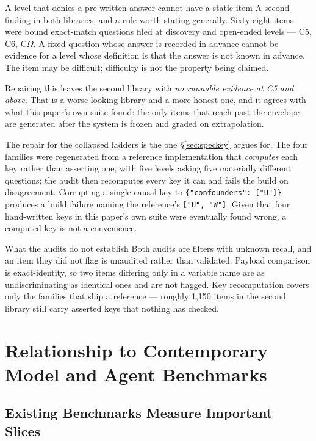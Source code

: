 \documentclass[11pt]{article}
\theoremstyle{definition}
\newcommand{\Om}{\ensuremath{\Omega}}
\begin{document}
\begin{claimbox}{A level that denies a pre-written answer cannot have a static item}
A second finding in both libraries, and a rule worth stating generally. Sixty-eight items were bound exact-match questions filed at discovery and open-ended levels --- C5, C6, C\Om{}. A fixed question whose answer is recorded in advance cannot be evidence for a level whose definition is that the answer is not known in advance. The item may be difficult; difficulty is not the property being claimed.

Repairing this leaves the second library with \emph{no runnable evidence at C5 and above}. That is a worse-looking library and a more honest one, and it agrees with what this paper's own suite found: the only items that reach past the envelope are generated after the system is frozen and graded on extrapolation.
\end{claimbox}

The repair for the collapsed ladders is the one \S\ref{sec:speckey} argues for. The four families were regenerated from a reference implementation that \emph{computes} each key rather than asserting one, with five levels asking five materially different questions; the audit then recomputes every key it can and fails the build on disagreement. Corrupting a single causal key to \texttt{\{"confounders": ["U"]\}} produces a build failure naming the reference's \texttt{["U", "W"]}. Given that four hand-written keys in this paper's own suite were eventually found wrong, a computed key is not a convenience.

\begin{cautionbox}{What the audits do not establish}
Both audits are filters with unknown recall, and an item they did not flag is unaudited rather than validated. Payload comparison is exact-identity, so two items differing only in a variable name are as undiscriminating as identical ones and are not flagged. Key recomputation covers only the families that ship a reference --- roughly 1{,}150 items in the second library still carry asserted keys that nothing has checked.
\end{cautionbox}

\section{Relationship to Contemporary Model and Agent Benchmarks}

\subsection{Existing Benchmarks Measure Important Slices}
\end{document}
